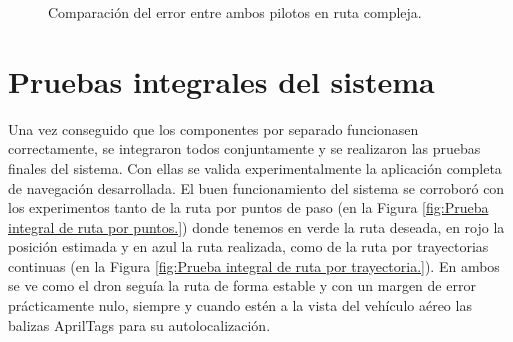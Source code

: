 \begin{figure}[H]
 \centering
 \caption{Comparación del error entre ambos pilotos en ruta compleja.}
 \label{f:Comparativa del error compleja.}
\end{figure} 

\section{Pruebas integrales del sistema}
\hspace{1cm} Una vez conseguido que los componentes por separado funcionasen correctamente, se integraron todos conjuntamente y se realizaron las pruebas finales del sistema. Con ellas se valida experimentalmente la aplicación completa de navegación desarrollada. El buen funcionamiento del sistema se corroboró con los experimentos tanto de la ruta por puntos de paso (en la Figura \ref{fig:Prueba integral de ruta por puntos.}) donde tenemos en verde la ruta deseada, en rojo la posición estimada y en azul la ruta realizada, como de la ruta por trayectorias continuas (en la Figura \ref{fig:Prueba integral de ruta por trayectoria.}). En ambos se ve como el dron seguía la ruta de forma estable y con un margen de error prácticamente nulo, siempre y cuando estén a la vista del vehículo aéreo las balizas AprilTags para su autolocalización. 

